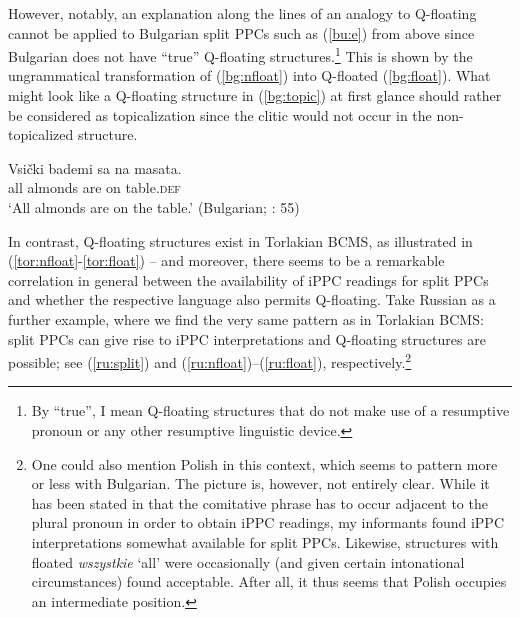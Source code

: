 \documentclass[output=paper,colorlinks,citecolor=brown]{langscibook}
\begin{document}
However, notably, an explanation along the lines of an analogy to Q-floating cannot be applied to Bulgarian split PPCs such as (\ref{bu:e}) from above since Bulgarian does not have ``true'' Q-floating structures.\footnote{By ``true'', I mean Q-floating structures that do not make use of a resumptive pronoun or any other resumptive linguistic device.} This is shown by the ungrammatical transformation of (\ref{bg:nfloat}) into Q-floated (\ref{bg:float}). What might look like a Q-floating structure in (\ref{bg:topic}) at first glance should rather be considered as topicalization since the clitic would not occur in the non-topicalized structure.

\ea \ea
\gll Vsički bademi sa na masata. \\
 all almonds are on table.\textsc{def} \\
 \glt `All almonds are on the table.' \label{bg:nfloat}
\z
\hfill (Bulgarian; \cite{VulchanovaGiusti1995}: 55)
\z

\noindent In contrast, Q-floating structures exist in Torlakian BCMS, as illustrated in (\ref{tor:nfloat}-\ref{tor:float}) -- and moreover, there seems to be a remarkable correlation in general between the availability of iPPC readings for split PPCs and whether the respective language also permits Q-floating. Take Russian as a further example, where we find the very same pattern as in Torlakian BCMS: split PPCs can give rise to iPPC interpretations and Q-floating structures are possible; see (\ref{ru:split}) and (\ref{ru:nfloat})--(\ref{ru:float}), respectively.\footnote{One could also mention Polish in this context, which seems to pattern more or less with Bulgarian. The picture is, however, not entirely clear. While it has been stated in \citet{FeldmanDyla2008} that the comitative phrase has to occur adjacent to the plural pronoun in order to obtain iPPC readings, my informants found iPPC interpretations somewhat available for split PPCs. Likewise, structures with floated \textit{wszystkie} `all' were occasionally (and given certain intonational circumstances) found acceptable. After all, it thus seems that Polish occupies an intermediate position.} 
\end{document}

